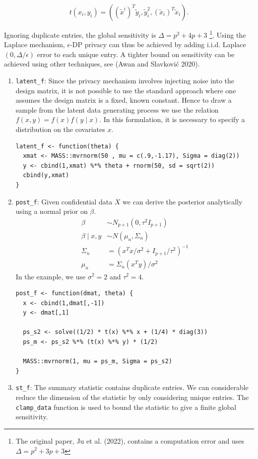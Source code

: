 \[
t(x_i,y_i) = ((\tilde{x}^{i})^T \tilde{y}_i, \tilde{y}_i^2, (\tilde{x}_{i})^T \tilde{x}_i).
\]

Ignoring duplicate entries, the global sensitivity is \(\Delta = p^2 + 4p + 3\) \footnote{The original paper, Ju et al. (2022), contains a computation error and uses \(\Delta = p^2 + 3p + 3\)}.
Using the Laplace mechanism, \(\epsilon\)-DP privacy can thus be achieved by adding i.i.d. Laplace\((0, \Delta/\epsilon)\)
error to each unique entry. A tighter bound on sensitivity can be achieved using
other techniques, see (Awan and Slavković 2020).

\begin{enumerate}
\def\labelenumi{\arabic{enumi}.}
\item
  \texttt{latent\_f}: Since the privacy mechanism involves injecting noise into the design
  matrix, it is not possible to use the standard approach where one assumes the design
  matrix is a fixed, known constant. Hence to draw a sample from the latent data generating
  process we use the relation \(f(x,y) = f(x)f(y \mid x)\). In this formulation,
  it is necessary to specify a distribution on the covariates \(x\).

\begin{verbatim}
latent_f <- function(theta) {
  xmat <- MASS::mvrnorm(50 , mu = c(.9,-1.17), Sigma = diag(2))
  y <- cbind(1,xmat) %*% theta + rnorm(50, sd = sqrt(2))
  cbind(y,xmat)
}
\end{verbatim}
\item
  \texttt{post\_f}: Given confidential data \(X\) we can derive the posterior analytically
  using a normal prior on \(\beta\).
  \[
  \begin{aligned}
  \beta &\sim N_{p+1}(0, \tau^2 I_{p+1})\\
  \beta \mid x,y &\sim N(\mu_n, \Sigma_n)\\
  \Sigma_n &= (x^Tx/\sigma^2 + I_{p+1}/\tau^2)^{-1}\\
  \mu_n &= \Sigma_n(x^Ty)/\sigma^2
  \end{aligned}
  \]
  In the example, we use \(\sigma^2 = 2\) and \(\tau^2 = 4\).

\begin{verbatim}
post_f <- function(dmat, theta) {
  x <- cbind(1,dmat[,-1])
  y <- dmat[,1]

  ps_s2 <- solve((1/2) * t(x) %*% x + (1/4) * diag(3))
  ps_m <- ps_s2 %*% (t(x) %*% y) * (1/2)

  MASS::mvrnorm(1, mu = ps_m, Sigma = ps_s2)
}
\end{verbatim}
\item
  \texttt{st\_f}: The summary statistic contains duplicate
  entries. We can considerable reduce the dimension of the
  statistic by only considering unique entries. The \texttt{clamp\_data}
  function is used to bound the statistic to give a finite
  global sensitivity.


\end{enumerate}
